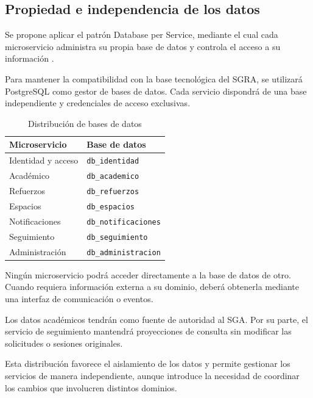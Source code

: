 \subsection{Propiedad e independencia de los datos}

Se propone aplicar el patrón Database per Service,
mediante el cual cada microservicio administra su
propia base de datos y controla el acceso a su
información \cite{microsoft-data-sovereignty}.

Para mantener la compatibilidad con la base tecnológica
del SGRA, se utilizará PostgreSQL como gestor de bases
de datos. Cada servicio dispondrá de una base independiente
y credenciales de acceso exclusivas.

\begin{table}[htbp]
    \centering
    \caption{Distribución de bases de datos}
    \label{tab:bases-datos}
    \small
    \begin{tabular}{ll}
        \toprule
        \textbf{Microservicio} & \textbf{Base de datos} \\
        \midrule
        Identidad y acceso & \texttt{db\_identidad} \\
        Académico & \texttt{db\_academico} \\
        Refuerzos & \texttt{db\_refuerzos} \\
        Espacios & \texttt{db\_espacios} \\
        Notificaciones & \texttt{db\_notificaciones} \\
        Seguimiento & \texttt{db\_seguimiento} \\
        Administración & \texttt{db\_administracion} \\
        \bottomrule
    \end{tabular}
\end{table}

Ningún microservicio podrá acceder directamente a la
base de datos de otro. Cuando requiera información
externa a su dominio, deberá obtenerla mediante una
interfaz de comunicación o eventos.

Los datos académicos tendrán como fuente de autoridad
al SGA. Por su parte, el servicio de seguimiento
mantendrá proyecciones de consulta sin modificar
las solicitudes o sesiones originales.

Esta distribución favorece el aislamiento de los datos
y permite gestionar los servicios de manera independiente,
aunque introduce la necesidad de coordinar los cambios
que involucren distintos dominios.

